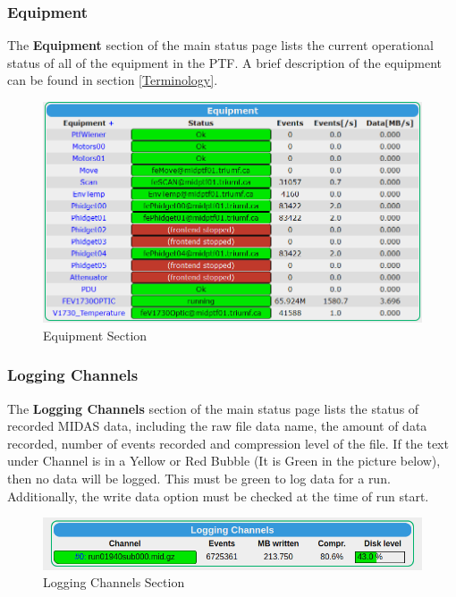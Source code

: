 \documentclass[twoside,letterpaper]{refart}
\begin{document}
\FloatBarrier

\subsubsection{Equipment}

The \textbf{Equipment} section of the main status page lists the current operational status of all of the equipment in the PTF.  A brief description of the equipment can be found in section \ref{Terminology}.

\FloatBarrier

\begin{figure}[!htpb] 
	\centering	
	\includegraphics[scale=0.4]{images/equipment.png}
	\caption{Equipment Section}
	\label{equipment}
\end{figure}

\FloatBarrier

\subsubsection{Logging Channels}

The \textbf{Logging Channels} section of the main status page lists the status of recorded MIDAS data, including the raw file data name, the amount of data recorded, number of events recorded and compression level of the file.  If the text under Channel is in a Yellow or Red Bubble (It is Green in the picture below), then no data will be logged.  This must be green to log data for a run.  Additionally, the write data option must be checked at the time of run start.

\FloatBarrier

\begin{figure}[!htpb] 
	\centering	
	\includegraphics[scale=0.3]{images/loggingChannels.png}
	\caption{Logging Channels Section}
	\label{loggingChannels}
\end{figure}
\end{document}
